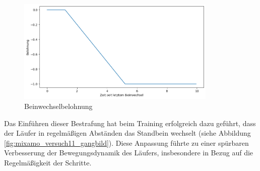 \begin{figure}[H]
  \centering
  \includegraphics[width=0.85\textwidth]{img/plot_beinwechsel} 
  \caption{Beinwechselbelohnung}
  \label{fig:plot_beinwechsel}
\end{figure}

Das Einführen dieser Bestrafung hat beim Training erfolgreich dazu geführt, dass der Läufer in regelmäßigen Abständen das Standbein wechselt (siehe Abbildung \ref{fig:mixamo_versuch11_gangbild}). Diese Anpassung führte zu einer spürbaren Verbesserung der Bewegungsdynamik des Läufers, insbesondere in Bezug auf die Regelmäßigkeit der Schritte.

